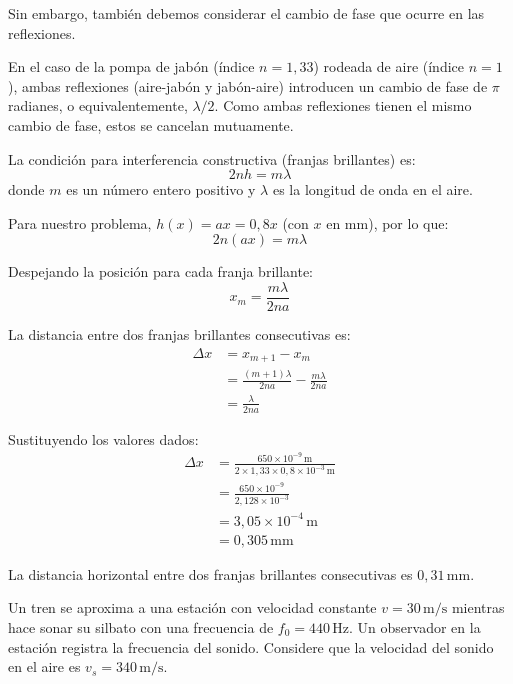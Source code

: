 \documentclass[
  11pt,
  letterpaper,
   addpoints,
   answers
  ]{exam}
\begin{document}
\begin{questions}
\begin{solution}
Sin embargo, también debemos considerar el cambio de fase que ocurre en las reflexiones.

En el caso de la pompa de jabón (índice $n = 1{,}33$) rodeada de aire (índice $n = 1$), ambas reflexiones (aire-jabón y jabón-aire) introducen un cambio de fase de $\pi$ radianes, o equivalentemente, $\lambda/2$. Como ambas reflexiones tienen el mismo cambio de fase, estos se cancelan mutuamente.

La condición para interferencia constructiva (franjas brillantes) es:
\begin{equation}
2nh = m\lambda
\end{equation}
donde $m$ es un número entero positivo y $\lambda$ es la longitud de onda en el aire.

Para nuestro problema, $h(x) = ax = 0{,}8x$ (con $x$ en mm), por lo que:
\begin{equation}
2n(ax) = m\lambda
\end{equation}

Despejando la posición para cada franja brillante:
\begin{equation}
x_m = \frac{m\lambda}{2na}
\end{equation}

La distancia entre dos franjas brillantes consecutivas es:
\begin{align}
\Delta x &= x_{m+1} - x_m \\
&= \frac{(m+1)\lambda}{2na} - \frac{m\lambda}{2na} \\
&= \frac{\lambda}{2na}
\end{align}

Sustituyendo los valores dados:
\begin{align}
\Delta x &= \frac{650 \times 10^{-9}\,\mathrm{m}}{2 \times 1{,}33 \times 0{,}8 \times 10^{-3}\,\mathrm{m}} \\
&= \frac{650 \times 10^{-9}}{2{,}128 \times 10^{-3}} \\
&= 3{,}05 \times 10^{-4}\,\mathrm{m} \\
&= 0{,}305\,\mathrm{mm}
\end{align}

La distancia horizontal entre dos franjas brillantes consecutivas es $\boxed{0{,}31\,\mathrm{mm}}$.

\end{solution}
\question Un tren se aproxima a una estación con velocidad constante $v = 30\,\mathrm{m/s}$ mientras hace sonar su silbato con una frecuencia de $f_0 = 440\,\mathrm{Hz}$. Un observador en la estación registra la frecuencia del sonido. Considere que la velocidad del sonido en el aire es $v_s = 340\,\mathrm{m/s}$.


\end{questions}
\end{document}
